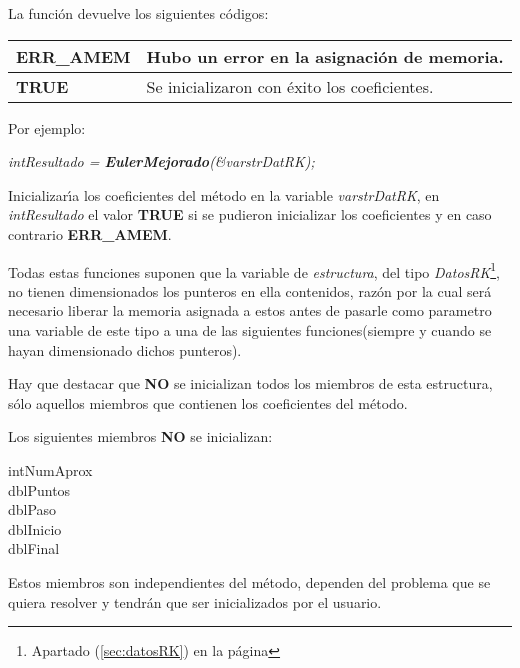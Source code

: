 La funci\'on devuelve los siguientes c\'odigos:

\begin{center}
\begin{tabular}{|l|l|}
\hline
\textbf{ERR\_AMEM} & Hubo un error en la asignaci\'on de memoria. \\
\hline
\textbf{TRUE} & Se inicializaron con \'exito los coeficientes. \\
\hline
\end{tabular}
\end{center}

Por ejemplo:

\begin{center}
\emph{intResultado = \textbf{EulerMejorado}(\&varstrDatRK);}
\end{center}


Inicializar\'{\i}a los coeficientes del m\'etodo en la variable
\emph{varstrDatRK}, en \emph{intResultado} el valor \textbf{TRUE} si se pudieron
inicializar los coeficientes y en caso contrario \textbf{ERR\_AMEM}.





Todas estas funciones suponen que la variable de \emph{estructura}, del tipo
\emph{DatosRK}\footnote{Apartado (\ref{sec:datosRK}) en la p\'agina 
\pageref{sec:datosRK}}, no tienen dimensionados los punteros en ella 
contenidos, raz\'on por la cual ser\'a necesario liberar la memoria asignada
a estos antes de pasarle como parametro una variable de este tipo a una de
las siguientes funciones(siempre y cuando se hayan dimensionado dichos
punteros).\newline

Hay que destacar que \textbf{NO} se inicializan todos los miembros de esta
estructura, s\'olo aquellos miembros que contienen los coeficientes del 
m\'etodo.\newline

Los siguientes miembros \textbf{NO} se inicializan:
%
\begin{description}
\item[intNumAprox]
\item[dblPuntos]
\item[dblPaso]
\item[dblInicio]
\item[dblFinal]
\end{description}

Estos miembros son independientes del m\'etodo, dependen del problema que
se quiera resolver y tendr\'an que ser inicializados por el usuario.
